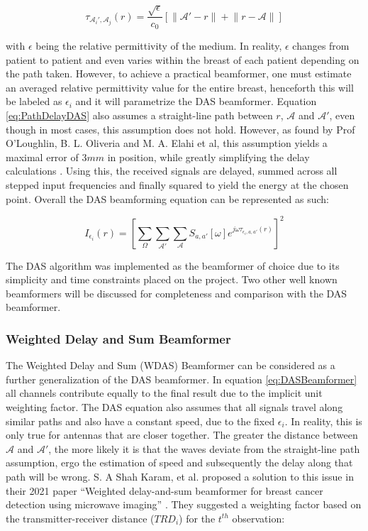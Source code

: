 \begingroup
\large
\begin{equation}
    \tau_{\mathcal{A}_i', \mathcal{A}_j}(r) = \frac{\sqrt{\epsilon}}{c_0} \left [\lVert \mathcal{A}' - r \rVert + \lVert r - \mathcal{A}\rVert\right ]
    \label{eq:PathDelayDAS}
\end{equation}
\endgroup

with $\epsilon$ being the relative permittivity of the medium. In reality, $\epsilon$ changes from patient to patient
and even varies within the breast of each patient depending on the path taken. However, to achieve a practical
beamformer, one must estimate an averaged relative permittivity value for the entire breast, henceforth this will be
labeled as $\epsilon_i$ and it will parametrize the DAS beamformer. Equation \ref{eq:PathDelayDAS} also assumes a
straight-line path between $r$, $\mathcal{A}$ and $\mathcal{A'}$, even though in most cases, this assumption does not
hold. However, as found by Prof O'Loughlin, B. L. Oliveria and M. A. Elahi et al, this assumption yields a maximal error
of $3mm$ in position, while greatly simplifying the delay calculations \cite{oloughlinParameterSearchAlgorithms2017}.
Using this, the received signals are delayed, summed across all stepped input frequencies and finally squared to yield
the energy at the chosen point. Overall the DAS beamforming equation can be represented as such:

\begingroup
\large
\begin{equation}
    I_{\epsilon_i}(r) = \left [\sum_{\Omega}\sum_{\mathcal{A}'}\sum_{\mathcal{A}} S_{a, a'}[\omega]e^{j\omega \tau_{\epsilon_i, a, a'}(r)}\right ]^2
    \label{eq:DASBeamformer}
\end{equation}
\endgroup

The DAS algorithm was implemented as the beamformer of choice due to its simplicity and time constraints placed on the
project. Two other well known beamformers will be discussed for completeness and comparison with the DAS beamformer. 

\subsubsection{Weighted Delay and Sum Beamformer}
The Weighted Delay and Sum (WDAS) Beamformer can be considered as a further generalization of the DAS beamformer. In
equation \ref{eq:DASBeamformer} all channels contribute equally to the final result due to the implicit unit weighting
factor. The DAS equation also assumes that all signals travel along similar paths and also have a constant speed, due to
the fixed $\epsilon_i$. In reality, this is only true for antennas that are closer together. The greater the distance
between $\mathcal{A}$ and $\mathcal{A'}$, the more likely it is that the waves deviate from the straight-line path
assumption, ergo the estimation of speed and subsequently the delay along that path will be wrong. S. A Shah Karam, et
al. proposed a solution to this issue in their 2021 paper ``Weighted delay-and-sum beamformer for breast cancer
detection using microwave imaging'' \cite{shahkaramWeightedDelayandsumBeamformer2021}. They suggested a weighting factor
based on the transmitter-receiver distance ($TRD_i$) for the $t^{th}$ observation:

